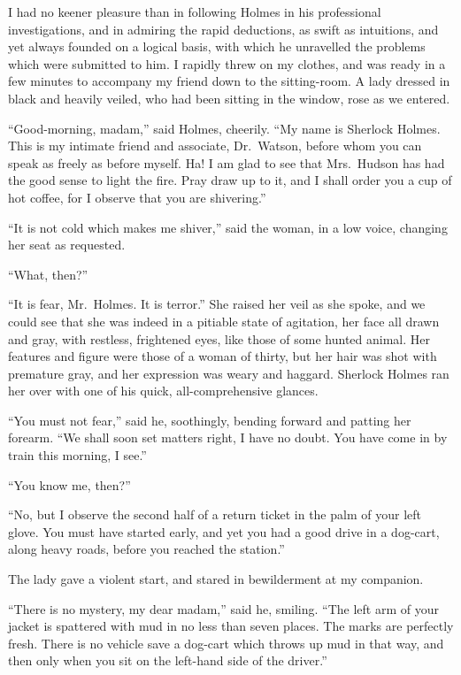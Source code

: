 I had no keener pleasure than in following Holmes in his
professional investigations, and in admiring the rapid deductions,
as swift as intuitions, and yet always founded on a logical
basis, with which he unravelled the problems which were
submitted to him. I rapidly threw on my clothes, and was
ready in a few minutes to accompany my friend down to the
sitting-room. A lady dressed in black and heavily veiled,
who had been sitting in the window, rose as we entered.

\begin{sloppypar}
“Good-morning, madam,” said Holmes, cheerily. “My
name is Sherlock Holmes. This is my intimate friend and
associate, Dr.\ Watson, before whom you can speak as freely
as before myself. Ha! I am glad to see that Mrs.~Hudson
has had the good sense to light the fire. Pray draw up to it,
and I shall order you a cup of hot coffee, for I observe that
you are shivering.”
\end{sloppypar}

“It is not cold which makes me shiver,” said the woman,
in a low voice, changing her seat as requested.

“What, then?”

“It is fear, Mr.~Holmes. It is terror.” She raised her
veil as she spoke, and we could see that she was indeed in a
pitiable state of agitation, her face all drawn and gray, with
restless, frightened eyes, like those of some hunted animal.
Her features and figure were those of a woman of thirty, but
her hair was shot with premature gray, and her expression
was weary and haggard. Sherlock Holmes ran her over with
one of his quick, all-comprehensive glances.

“You must not fear,” said he, soothingly, bending forward
and patting her forearm. “We shall soon set matters right,
I have no doubt. You have come in by train this morning, I
see.”

“You know me, then?”

“No, but I observe the second half of a return ticket in the
palm of your left glove. You must have started early, and
yet you had a good drive in a dog-cart, along heavy roads, before
you reached the station.”

The lady gave a violent start, and stared in bewilderment
at my companion.

“There is no mystery, my dear madam,” said he, smiling.
“The left arm of your jacket is spattered with mud in no less
than seven places. The marks are perfectly fresh. There is
no vehicle save a dog-cart which throws up mud in that way,
and then only when you sit on the left-hand side of the
driver.”

